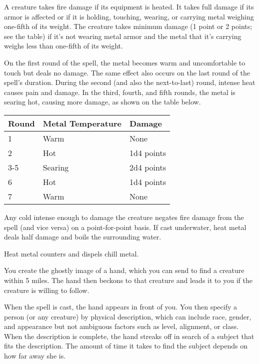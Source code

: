 \begin{multicols}{2}
\begin{small}
\smallskip\noindent A creature takes fire damage if its equipment is heated. It takes full damage if its armor is affected or if it is holding, touching, wearing, or carrying metal weighing one-fifth of its weight. The creature takes minimum damage (1 point or 2 points; see the table) if it's not wearing metal armor and the metal that it's carrying weighs less than one-fifth of its weight.

\smallskip\noindent On the first round of the spell, the metal becomes warm and uncomfortable to touch but deals no damage. The same effect also occurs on the last round of the spell's duration. During the second (and also the next-to-last) round, intense heat causes pain and damage. In the third, fourth, and fifth rounds, the metal is searing hot, causing more damage, as shown on the table below.

\begin{center}
\begin{tabular}[h!]{l|ll}
Round & Metal Temperature & Damage \\ \hline
1 & Warm & None \\	   
2 & Hot & 1d4 points \\
3-5 & Searing & 2d4 points \\
6 & Hot & 1d4 points \\
7 & Warm & None \\
\end{tabular}
\end{center}

\smallskip\noindent Any cold intense enough to damage the creature negates fire damage from the spell (and vice versa) on a point-for-point basis. If cast underwater, heat metal deals half damage and boils the surrounding water.

\smallskip\noindent Heat metal counters and dispels chill metal.

\noindent You create the ghostly image of a hand, which you can send to find a creature within 5 miles. The hand then beckons to that creature and leads it to you if the creature is willing to follow.

\smallskip\noindent When the spell is cast, the hand appears in front of you. You then specify a person (or any creature) by physical description, which can include race, gender, and appearance but not ambiguous factors such as level, alignment, or class. When the description is complete, the hand streaks off in search of a subject that fits the description. The amount of time it takes to find the subject depends on how far away she is.


\end{small}
\end{multicols}
